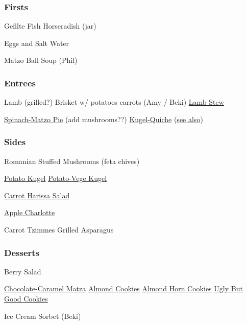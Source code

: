 \begin{centering}
 \subsubsection*{Firsts}
 Gefilte Fish \And Horseradish (jar)

 Eggs and Salt Water

 Matzo Ball Soup (Phil)

 \subsubsection*{Entrees}

 Lamb (grilled?) \blt Brisket w/ potatoes \And carrots (Amy / Beki) \blt \href{https://instantpoteats.com/instant-pot-leg-lamb-stew-dates-cinnamon/}{Lamb Stew}

 \hyperref[Spinach Matzo Pie]{Spinach-Matzo Pie} (add mushrooms??) \blt \href{https://www.myjewishlearning.com/the-nosher/quiche-with-veggie-crust-recipe/}{Kugel-Quiche} (\href{https://toriavey.com/toris-kitchen/potato-crusted-spinach-frittata/}{see also})

 \subsubsection*{Sides}
 Romanian Stuffed Mushrooms (feta \And chives)

 \href{https://smittenkitchen.com/2015/12/potato-kugel/}{Potato Kugel} \blt \href{https://www.epicurious.com/recipes/food/views/potato-carrot-and-zucchini-kugel-241904}{Potato-Vege Kugel}

 \hyperref[Carrot Harissa Salad]{Carrot Harissa Salad}

 \hyperref[Apple Matzo Charlotte]{Apple Charlotte}

 Carrot Tzimmes \blt Grilled Asparagus

 \subsubsection*{Desserts}
 Berry Salad

 \href{https://smittenkitchen.com/2009/04/chocolate-caramel-crackers/}{Chocolate-Caramel Matza}
 \blt \href{https://smittenkitchen.com/2009/04/chewy-amaretti-cookies/}{Almond Cookies} \blt \href{https://smittenkitchen.com/2017/04/almond-horn-cookies/}{Almond Horn Cookies} \blt \href{https://smittenkitchen.com/2016/01/ugly-but-good-cookies/}{Ugly But Good Cookies}

 Ice Cream \blt Sorbet (Beki)

\end{centering}

